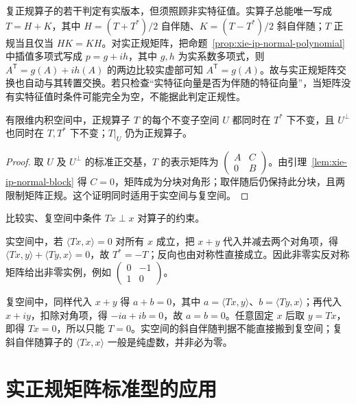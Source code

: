 复正规算子的若干判定有实版本，但须照顾非实特征值。实算子总能唯一写成 $T=H+K$，其中 $H=(T+T^*)/2$ 自伴随、$K=(T-T^*)/2$ 斜自伴随；$T$ 正规当且仅当 $HK=KH$。对实正规矩阵，把命题~\ref{prop:xie-ip-normal-polynomial} 中插值多项式写成 $p=g+ih$，其中 $g,h$ 为实系数多项式，则 $A^{\mathsf T}=g(A)+ih(A)$ 的两边比较实虚部可知 $A^{\mathsf T}=g(A)$。故与实正规矩阵交换也自动与其转置交换。若只检查“实特征向量是否为伴随的特征向量”，当矩阵没有实特征值时条件可能完全为空，不能据此判定正规性。

\begin{proposition}
\label{prop:xie-ip-reducing}
有限维内积空间中，正规算子 $T$ 的每个不变子空间 $U$ 都同时在 $T^*$ 下不变，且 $U^\perp$ 也同时在 $T,T^*$ 下不变；$T|_U$ 仍为正规算子。
\end{proposition}
\begin{proof}
取 $U$ 及 $U^\perp$ 的标准正交基，$T$ 的表示矩阵为 $\begin{pmatrix}A&C\\0&B\end{pmatrix}$。由引理~\ref{lem:xie-ip-normal-block} 得 $C=0$，矩阵成为分块对角形；取伴随后仍保持此分块，且两限制矩阵正规。这个证明同时适用于实空间与复空间。
\end{proof}

\begin{example}
比较实、复空间中条件 $Tx\perp x$ 对算子的约束。
\end{example}
\begin{solve}
实空间中，若 $\langle Tx,x\rangle=0$ 对所有 $x$ 成立，把 $x+y$ 代入并减去两个对角项，得 $\langle Tx,y\rangle+\langle Ty,x\rangle=0$，故 $T^*=-T$；反向也由对称性直接成立。因此非零实反对称矩阵给出非零实例，例如 $\begin{pmatrix}0&-1\\1&0\end{pmatrix}$。

复空间中，同样代入 $x+y$ 得 $a+b=0$，其中 $a=\langle Tx,y\rangle$、$b=\langle Ty,x\rangle$；再代入 $x+iy$，扣除对角项，得 $-ia+ib=0$，故 $a=b=0$。任意固定 $x$ 后取 $y=Tx$，即得 $Tx=0$，所以只能 $T=0$。实空间的斜自伴随判据不能直接搬到复空间；复斜自伴随算子的 $\langle Tx,x\rangle$ 一般是纯虚数，并非必为零。
\end{solve}

\section{实正规矩阵标准型的应用}
\label{sec:xie-ip-real-normal-applications}

